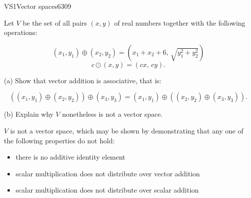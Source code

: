 \begin{exercise}{VS1}{Vector spaces}{6309} 
\begin{exerciseStatement} 

 Let \(V\) be the set of all pairs \((x,y)\) of real numbers together with the following operations: 

 \[(x_1,y_1)\oplus (x_2,y_2)=\left(x_{1} + x_{2} + 6,\,\sqrt{y_{1}^{2} + y_{2}^{2}}\right)\]\[c \odot (x,y) =\left(c x,\,c y\right).\] 

 (a) Show that vector addition is associative, that is: 

 \[
      \left((x_1,y_1)\oplus(x_2,y_2)\right)\oplus(x_3,y_3)=(x_1,y_1)\oplus\left((x_2,y_2)\oplus(x_3,y_3)\right).
    \] 

 (b) Explain why \(V\) nonetheless is not a vector space. 

 \end{exerciseStatement}
 \begin{exerciseAnswer} 

 \(V\) is not a vector space, which may be shown by demonstrating that any one of the following properties do not hold: 

 

\begin{itemize}
\item there is no additive identity element
\item scalar multiplication does not distribute over vector addition
\item scalar multiplication does not distribute over scalar addition
\end{itemize}

     \end{exerciseAnswer}
 \end{exercise}


